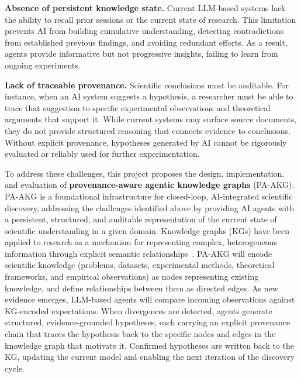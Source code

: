 \documentclass{files/proposalnsf}
\begin{document}
\textbf{Absence of persistent knowledge state.} Current LLM-based systems lack the ability to recall prior sessions or the current state of research. This limitation prevents AI from building cumulative understanding, detecting contradictions from established previous findings, and avoiding redundant efforts. As a result, agents provide informative but not progressive insights, failing to learn from ongoing experiments.

\textbf{Lack of traceable provenance.} Scientific conclusions must be auditable. For instance, when an AI system suggests a hypothesis, a researcher must be able to trace that suggestion to specific experimental observations and theoretical arguments that support it. While current systems may surface source documents, they do not provide structured reasoning that connects evidence to conclusions. Without explicit provenance, hypotheses generated by AI cannot be rigorously evaluated or reliably used for further experimentation. \vspace{-5pt}



To address these challenges, this project proposes the design, implementation, and evaluation of \textbf{provenance-aware agentic knowledge graphs} (PA-AKG). PA-AKG is a foundational infrastructure for closed-loop, AI-integrated scientific discovery, addressing the challenges identified above by providing AI agents with a persistent, structured, and auditable representation of the current state of scientific understanding in a given domain. Knowledge graphs (KGs) have been applied to research as a mechanism for representing complex, heterogeneous information through explicit semantic relationships~\cite{}. PA-AKG will encode scientific knowledge (\ie problems, datasets, experimental methods, theoretical frameworks, and empirical observations) as nodes representing existing knowledge, and define relationships between them as directed edges. As new evidence emerges, LLM-based agents will compare incoming observations against KG-encoded expectations. When divergences are detected, agents generate structured, evidence-grounded hypotheses, each carrying an explicit provenance chain that traces the hypothesis back to the specific nodes and edges in the knowledge graph that motivate it. Confirmed hypotheses are written back to the KG, updating the current model and enabling the next iteration of the discovery cycle.
\end{document}
